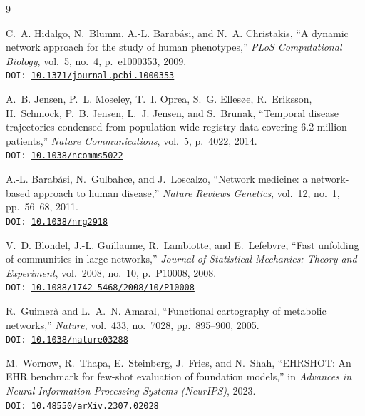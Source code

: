 \documentclass[10pt,twocolumn]{article}
\begin{document}
\balance
\begin{thebibliography}{9}

C.~A. Hidalgo, N.~Blumm, A.-L. Barab\'asi, and N.~A. Christakis,
``A dynamic network approach for the study of human phenotypes,''
\textit{PLoS Computational Biology}, vol.~5, no.~4, p.~e1000353, 2009.
\\\texttt{DOI: \href{https://doi.org/10.1371/journal.pcbi.1000353}{10.1371/journal.pcbi.1000353}}

A.~B. Jensen, P.~L. Moseley, T.~I. Oprea, S.~G. Elles\o{e}, R.~Eriksson, H.~Schmock, P.~B. Jensen, L.~J. Jensen, and S.~Brunak,
``Temporal disease trajectories condensed from population-wide registry data covering 6.2 million patients,''
\textit{Nature Communications}, vol.~5, p.~4022, 2014.
\\\texttt{DOI: \href{https://doi.org/10.1038/ncomms5022}{10.1038/ncomms5022}}

A.-L. Barab\'asi, N.~Gulbahce, and J.~Loscalzo,
``Network medicine: a network-based approach to human disease,''
\textit{Nature Reviews Genetics}, vol.~12, no.~1, pp.~56--68, 2011.
\\\texttt{DOI: \href{https://doi.org/10.1038/nrg2918}{10.1038/nrg2918}}

V.~D. Blondel, J.-L. Guillaume, R.~Lambiotte, and E.~Lefebvre,
``Fast unfolding of communities in large networks,''
\textit{Journal of Statistical Mechanics: Theory and Experiment}, vol.~2008, no.~10, p.~P10008, 2008.
\\\texttt{DOI: \href{https://doi.org/10.1088/1742-5468/2008/10/P10008}{10.1088/1742-5468/2008/10/P10008}}

R.~Guimer\`a and L.~A.~N. Amaral,
``Functional cartography of metabolic networks,''
\textit{Nature}, vol.~433, no.~7028, pp.~895--900, 2005.
\\\texttt{DOI: \href{https://doi.org/10.1038/nature03288}{10.1038/nature03288}}

M.~Wornow, R.~Thapa, E.~Steinberg, J.~Fries, and N.~Shah,
``EHRSHOT: An EHR benchmark for few-shot evaluation of foundation models,''
in \textit{Advances in Neural Information Processing Systems (NeurIPS)}, 2023.
\\\texttt{DOI: \href{https://doi.org/10.48550/arXiv.2307.02028}{10.48550/arXiv.2307.02028}}

\end{thebibliography}
\end{document}
